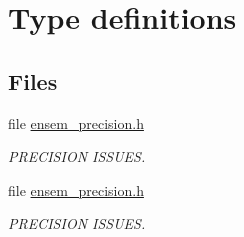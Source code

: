 \hypertarget{group__defs}{}\section{Type definitions}
\label{group__defs}
\subsection*{Files}
\begin{DoxyCompactItemize}
\item 
file \mbox{\hyperlink{lib_2ensem_2ensem__precision_8h}{ensem\+\_\+precision.\+h}}
\begin{DoxyCompactList}\small\item\em P\+R\+E\+C\+I\+S\+I\+ON I\+S\+S\+U\+ES. \end{DoxyCompactList}\item 
file \mbox{\hyperlink{install_2include_2ensem_2ensem__precision_8h}{ensem\+\_\+precision.\+h}}
\begin{DoxyCompactList}\small\item\em P\+R\+E\+C\+I\+S\+I\+ON I\+S\+S\+U\+ES. \end{DoxyCompactList}\end{DoxyCompactItemize}
